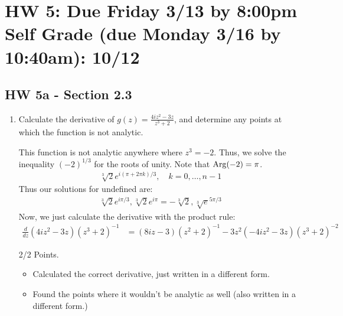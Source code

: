 \newpage
\section*{HW 5: Due Friday 3/13 by 8:00pm \\ Self Grade (due Monday 3/16 by 10:40am): 10/12} 
\subsection*{HW 5a - Section 2.3}
\begin{enumerate}
    \item Calculate the derivative of $g(z) = \frac{4iz^2-3z}{z^3+2}$, and determine any points at which the function is not analytic.

	\begin{problem}
		This function is not analytic anywhere where $z^3 = -2$. Thus, we solve the inequality $(-2)^{1/3}$ for the roots of unity. Note that $\operatorname{Arg}(-2) = \pi$. \gline{}
		\begin{align*}
			\sqrt[3]2e^{i(\pi+2\pi k)/3},\quad k=0,\ldots,n-1
		\end{align*}
		Thus our solutions for undefined are:
		\begin{align*}
			\sqrt[3]2e^{i\pi/3},\sqrt[3]2e^{i\pi}=-\sqrt[3]2, \sqrt[3]e^{5\pi/3}
		\end{align*}
		Now, we just calculate the derivative with the product rule:
		\begin{align*}
			\frac{d}{dz}(4iz^2-3z)(z^3+2)^{-1} &= (8iz - 3)(z^2+2)^{-1}-3z^2(-4iz^2-3z)(z^3+2)^{-2}
		\end{align*}
	\end{problem}
	\begin{grade}
		2/2 Points.
		\begin{itemize}[parsep=0pt, itemsep=0pt]
			\item Calculated the correct derivative, just written in a different form.
			\item Found the points where it wouldn't be analytic as well (also written in a different form.)
		\end{itemize}
	\end{grade}


\end{enumerate}
